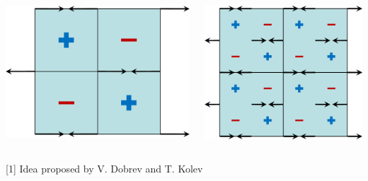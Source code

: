 \documentclass[8pt,xcolor=svgnames]{beamer}
\begin{document}
\begin{frame}
\bigskip
\begin{columns}
 \begin{column}{0.5\textwidth}
  \centering
   \includegraphics[height=0.5\textheight,keepaspectratio=true]{./Images/hgmodesQ1Q0.png}
 \end{column}
 \begin{column}{0.5\textwidth}
  \centering
   \includegraphics[height=0.5\textheight,keepaspectratio=true]{./Images/hgmodesQ2Q1.png}
 \end{column}
\end{columns}

\bigskip
\tiny{[1] Idea proposed by V. Dobrev and T. Kolev}
\end{frame}
\end{document}
